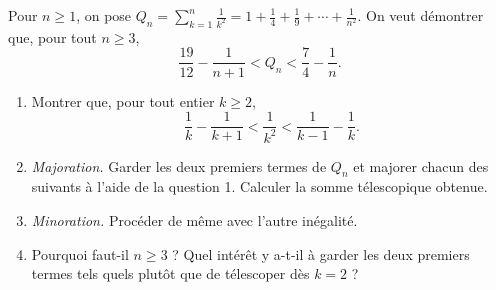 Pour $n \geqslant 1$, on pose
$Q_n = \displaystyle\sum_{k=1}^{n} \frac{1}{k^2} = 1 + \frac14 + \frac19 + \cdots + \frac{1}{n^2}$.
On veut démontrer que, pour tout $n \geqslant 3$,
\[
\frac{19}{12} - \frac{1}{n+1} < Q_n < \frac74 - \frac1n.
\]
\begin{enumerate}
  \item Montrer que, pour tout entier $k \geqslant 2$,
  \[
  \frac{1}{k} - \frac{1}{k+1} < \frac{1}{k^2} < \frac{1}{k-1} - \frac{1}{k}.
  \]
  \item \emph{Majoration.} Garder les deux premiers termes de $Q_n$ et majorer
  chacun des suivants à l'aide de la question 1. Calculer la somme
  télescopique obtenue.
  \item \emph{Minoration.} Procéder de même avec l'autre inégalité.
  \item Pourquoi faut-il $n \geqslant 3$ ? Quel intérêt y a-t-il à garder les
  deux premiers termes tels quels plutôt que de télescoper dès $k = 2$ ?
\end{enumerate}
